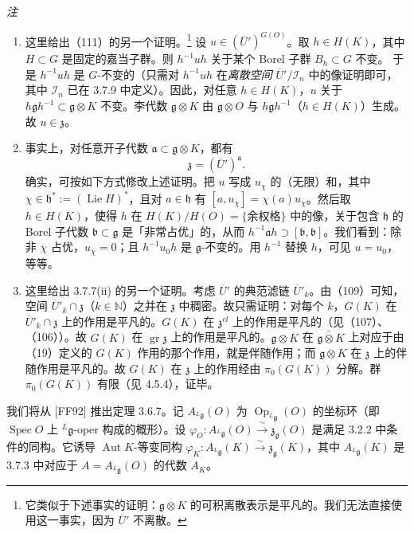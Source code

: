  \emph{注}
\begin{enumerate}[label=(\roman*),leftmargin=2.2em]
\item 这里给出（111）的另一个证明。\footnote{它类似于下述事实的证明：$\mathfrak{g}\otimes K$ 的可积离散表示是平凡的。我们无法直接使用这一事实，因为 $\overline{U}'$ 不离散。} 设 $u\in(\overline{U}')^{G(O)}$。取 $h\in H(K)$，其中 $H\subset G$ 是固定的嘉当子群。则 $h^{-1}uh$ 关于某个 Borel 子群 $B_h\subset G$ 不变。
于是 $h^{-1}uh$ 是 $G$-不变的（只需对 $h^{-1}uh$ 在\emph{离散空间} $\overline{U}'/\mathcal{I}_n$ 中的像证明即可，其中 $\mathcal{I}_n$ 已在 3.7.9 中定义）。因此，对任意 $h\in H(K)$，$u$ 关于 $h\mathfrak{g}h^{-1}\subset\mathfrak{g}\otimes K$ 不变。李代数 $\mathfrak{g}\otimes K$ 由 $\mathfrak{g}\otimes O$ 与 $h\mathfrak{g}h^{-1}$（$h\in H(K)$）生成。故 $u\in\mathfrak{z}$。
\item 事实上，对任意开子代数 $\mathfrak{a}\subset\mathfrak{g}\otimes K$，都有
\begin{equation}\tag{112}
\mathfrak{z}=(\overline{U}')^{\mathfrak{a}}.
\end{equation}
确实，可按如下方式修改上述证明。把 $u$ 写成 $u_\chi$ 的（无限）和，其中 $\chi\in\mathfrak{h}^*:=(\operatorname{Lie}H)^*$，且对 $a\in\mathfrak{h}$ 有 $[a,u_\chi]=\chi(a)u_\chi$。然后取 $h\in H(K)$，使得 $h$ 在 $H(K)/H(O)=\{\text{余权格}\}$ 中的像，关于包含 $\mathfrak{h}$ 的 Borel 子代数 $\mathfrak{b}\subset\mathfrak{g}$ 是「非常占优」的，从而 $h^{-1}\mathfrak{a}h\supset[\mathfrak{b},\mathfrak{b}]$。我们看到：除非 $\chi$ 占优，$u_\chi=0$；且 $h^{-1}u_0h$ 是 $\mathfrak{g}$-不变的。用 $h^{-1}$ 替换 $h$，可见 $u=u_0$，等等。
\item 这里给出 3.7.7(ii) 的另一个证明。考虑 $\overline{U}'$ 的典范滤链 $\overline{U}'_k$。由（109）可知，空间 $\overline{U}'_k\cap\mathfrak{z}$（$k\in\mathbb{N}$）之并在 $\mathfrak{z}$ 中稠密。故只需证明：对每个 $k$，$G(K)$ 在 $\overline{U}'_k\cap\mathfrak{z}$ 上的作用是平凡的。$G(K)$ 在 $\mathfrak{z}^{cl}$ 上的作用是平凡的（见（107）、（106））。故 $G(K)$ 在 $\operatorname{gr}\mathfrak{z}$ 上的作用是平凡的。$\mathfrak{g}\otimes K$ 在 $\widetilde{\mathfrak{g}\otimes K}$ 上对应于由（19）定义的 $G(K)$ 作用的那个作用，就是伴随作用；而 $\mathfrak{g}\otimes K$ 在 $\mathfrak{z}$ 上的伴随作用是平凡的。故 $G(K)$ 在 $\mathfrak{z}$ 上的作用经由 $\pi_0(G(K))$ 分解。群 $\pi_0(G(K))$ 有限（见 4.5.4），证毕。
\end{enumerate}

 我们将从 [FF92] 推出定理 3.6.7。记 $A_{{}^{L}\mathfrak{g}}(O)$ 为 $\operatorname{Op}_{{}^{L}\mathfrak{g}}(O)$ 的坐标环（即 $\operatorname{Spec}O$ 上 ${}^{L}\mathfrak{g}$-oper 构成的概形）。设 $\varphi_O:A_{{}^{L}\mathfrak{g}}(O)\xrightarrow{\ \sim\ }\mathfrak{z}_{\mathfrak{g}}(O)$ 是满足 3.2.2 中条件的同构。它诱导 $\operatorname{Aut}K$-等变同构 $\varphi_K:A_{{}^{L}\mathfrak{g}}(K)\xrightarrow{\ \sim\ }\mathfrak{z}_{\mathfrak{g}}(K)$，其中 $A_{{}^{L}\mathfrak{g}}(K)$ 是 3.7.3 中对应于 $A=A_{{}^{L}\mathfrak{g}}(O)$ 的代数 $A_K$。

